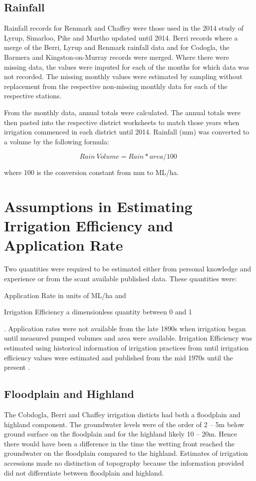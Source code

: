 \documentclass[a4paper, titlepage, 12pt]{article}\usepackage[]{graphicx}\usepackage[]{color}
\begin{document}
\begin{sffamily}
\subsection{Rainfall} Rainfall records for Renmark and Chaffey were those used in the 2014 study of Lyrup, Simarloo, Pike and Murtho \citep{Meissner2014} updated until 2014. Berri records where a merge of the Berri, Lyrup and Renmark rainfall data and for Codogla, the Barmera and Kingston-on-Murray records were merged. Where there were missing data, the values were imputed for each of the months for which data was not recorded. The missing monthly values were estimated by sampling without replacement from the respective non-missing monthly data for each of the respective stations.

From the monthly data, annual totals were calculated.  The annual totals were then pasted into the respective district worksheets to match those years when irrigation commenced in each district until 2014. Rainfall (mm) was converted to a volume by the following formula:

\begin{equation} \label{eqn03} 
  Rain\ Volume = Rain * area / 100
\end{equation}

where 100 is the conversion constant from mm to ML/ha.

\section{Assumptions in Estimating Irrigation Efficiency and Application Rate}
Two quantities were required to be estimated either from personal knowledge and experience or from the scant available published data.  These quantities were: \begin{inparaenum}[(i)] \item Application Rate in units of ML/ha and \item Irrigation Efficiency a dimensionless quantity between 0 and 1 \end{inparaenum}. Application rates were not available from the late 1890s when irrigation began until measured pumped volumes and area were available.  Irrigation Efficiency was estimated using historical information of irrigation practices from until irrigation efficiency values were estimated and published from the mid 1970s until the present \citep{Adams2009}.

\subsection{Floodplain and Highland} The Cobdogla, Berri and Chaffey irrigation disticts had both a floodplain and highland component. The groundwater levels were of the order of 2 -- 5m below ground surface on the floodplain and for the highland likely 10 -- 20m. Hence there would have been a difference in the time the wetting front reached the groundwater on the floodplain compared to the highland. Estimates of irrigation accessions made no distinction of topography because the information provided did not differntiate between floodplain and highland.


\end{sffamily}
\end{document}
